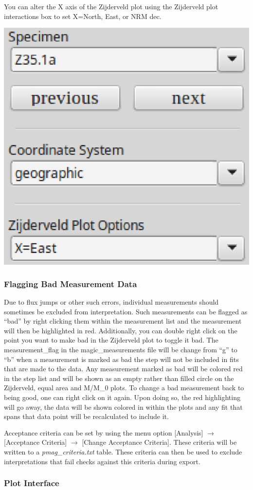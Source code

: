 \documentclass[11pt]{book}
\begin{document}
{\noindent You can alter the X axis of the Zijderveld plot using the Zijderveld plot interactions box to set X=North, East, or NRM dec.

\includegraphics[width=5 cm]{EPSFiles/demag_gui_ProjectionChoice.eps}

\subsubsection{Flagging Bad Measurement
Data}\label{flagging-bad-measurement-data}

Due to flux jumps or other such errors, individual measurements should sometimes be excluded from interpretation. Such measurements can be flagged as ``bad'' by right clicking them within the measurement list and the measurement will then be highlighted in red. Additionally, you can double right click on the point you want to make bad in the Zijderveld plot to toggle it bad. The measurement\_flag in the magic\_measurements file will be change from ``g'' to ``b'' when a measurement is marked as bad the step will not be included in fits that are made to the data. Any measurement marked as bad will be colored red in the step list and will be shown as an empty rather than filled circle on the Zijderveld, equal area and M/M\_0 plots. To change a bad measurement back to being good, one can right click on it again. Upon doing so, the red highlighting will go away, the data will be shown colored in within the plots and any fit that spans that data point will be recalculated to include it.

\noindent Acceptance criteria can be set by using the menu option [Analysis] $\rightarrow$ [Acceptance
Criteria] $\rightarrow$ [Change Acceptance Criteria]. These criteria will be written to a {\it pmag\_criteria.txt}  table. These criteria can then be used to exclude interpretations that fail checks against this criteria during export.

\subsubsection{Plot Interface}\label{plot-interface}

}
\end{document}
